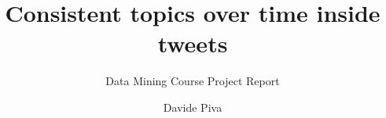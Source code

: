 \documentclass[sigconf,edbt]{acmart-edbt2021}
\begin{document}
\title{Consistent topics over time inside tweets}
\subtitle{Data Mining Course Project Report}
  

\author{Davide Piva}


\maketitle





\end{document}
